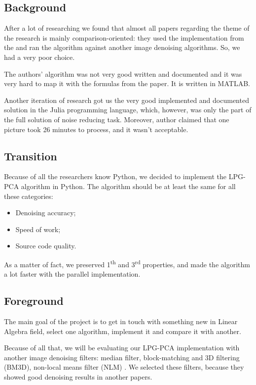\subsection{Background}
After a lot of researching we found that almost all papers regarding the theme of the research is mainly comparison-oriented: they used the implementation from the \cite{zhang2010two} and ran the algorithm against another image denoising algorithms. So, we had a very poor choice.

The authors’ algorithm was not very good written and documented and it was very hard to map it with the formulas from the paper. It is written in MATLAB. 

Another iteration of research got us the very good implemented and documented solution\cite{image_denoising} in the Julia programming language, which, however, was only the part of the full solution of noise reducing task. Moreover, author claimed that one picture took 26 minutes to process, and it wasn’t acceptable.

\subsection{Transition}
Because of all the researchers know Python, we decided to implement the LPG-PCA algorithm in Python. The algorithm should be at least the same for all these categories:
\begin{itemize}
    \item Denoising accuracy;
    \item Speed of work;
    \item Source code quality.
\end{itemize}
As a matter of fact, we preserved 1\textsuperscript{th} and 3\textsuperscript{rd} properties, and made the algorithm a lot faster with the parallel implementation.

\subsection{Foreground}
The main goal of the project is to get in touch with something new in Linear Algebra field, select one algorithm, implement it and compare it with another. 

Because of all that, we will be evaluating our LPG-PCA implementation with another image denoising filters: median filter, block-matching and 3D filtering (BM3D)\cite{dabov2006image}, non-local means filter (NLM) \cite{buades2005non}. We selected these filters, because they showed good denoising results in another papers. 

